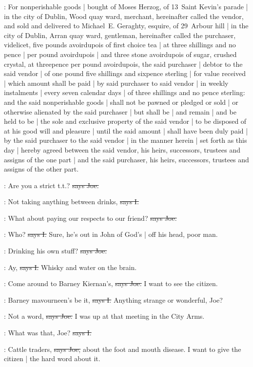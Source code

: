 :
For nonperishable goods |
bought of Moses Herzog,
of 13~Saint Kevin's parade |
in the city of Dublin,
Wood quay ward,
merchant,
hereinafter called the vendor,
and sold and delivered to
Michael~E.
Geraghty,
esquire,
of 29~Arbour hill |
in the city of Dublin,
Arran quay ward,
gentleman,
hereinafter called the purchaser,
videlicet,
five pounds avoirdupois of first choice tea |
at three shillings and no pence |
per pound avoirdupois |
and three stone avoirdupois of sugar,
crushed crystal,
at threepence per pound avoirdupois,
the said purchaser |
debtor to the said vendor |
of one pound five shillings and sixpence sterling |
for value received |
which amount shall be paid |
by said purchaser to said vendor |
in weekly instalments |
every seven calendar days |
of three shillings and no pence sterling:
and the said nonperishable goods |
shall not be pawned or pledged or sold |
or otherwise alienated by the said purchaser |
but shall be |
and remain |
and be held to be |
the sole and exclusive property of the said vendor |
to be disposed of at his good will and pleasure |
until the said amount |
shall have been duly paid |
by the said purchaser to the said vendor |
in the manner herein |
set forth as this day |
hereby agreed between the said vendor,
his heirs,
successors,
trustees
and assigns of the one part |
and the said purchaser,
his heirs,
successors,
trustees
and assigns of the other part.

\joe:
Are you a strict t.t.?
\sout{says Joe.}

:
Not taking anything between drinks,
\sout{says I.}

\joe:
What about paying our respects to our friend?
\sout{says Joe.}

:
Who?
\sout{says I.}
Sure,
he's out in John of God's |
off his head,
poor man.

\joe:
Drinking his own stuff?
\sout{says Joe.}

:
Ay,
\sout{says I.}
Whisky and water on the brain.

\joe:
Come around to Barney Kiernan's,
\sout{says Joe.}
I want to see the citizen.

:
Barney mavourneen's be it,
\sout{says I.}
Anything strange or wonderful,
Joe?

\joe:
Not a word,
\sout{says Joe.}
I was up at that meeting in the City Arms.

:
What was that,
Joe?
\sout{says I.}

\joe:
Cattle traders,
\sout{says Joe,}
about the foot and mouth disease.
I want to give the citizen |
the hard word about it.

